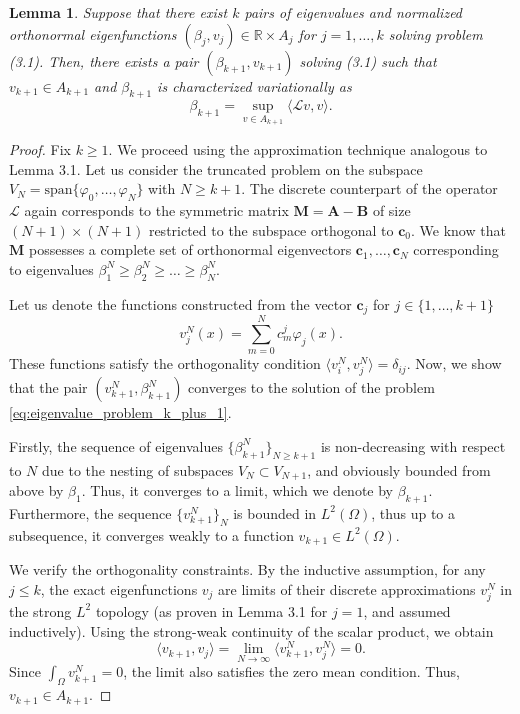 \documentclass[11pt, a4paper]{article}
\theoremstyle{break}
\theoremstyle{break}
\theoremstyle{break}
\theoremstyle{break}
\theoremstyle{break}
\newtheorem{lem}{Lemma}[section]
\theoremstyle{break}
\theoremstyle{break}
\theoremstyle{break}
\theoremstyle{break}
\theoremstyle{break}
\begin{document}
\begin{lem}
    \label{lem:inductive_step}
    Suppose that there exist $k$ pairs of eigenvalues and normalized orthonormal eigenfunctions $(\beta_j, v_j) \in \mathbb{R} \times A_j$ for $j=1, \ldots, k$ solving problem (3.1). Then, there exists a pair $(\beta_{k+1}, v_{k+1})$ solving (3.1) such that $v_{k+1} \in A_{k+1}$ and $\beta_{k+1}$ is characterized variationally as
    \begin{equation}
        \label{eq:eigenvalue_problem_k_plus_1}
        \beta_{k+1} = \sup_{v \in A_{k+1}} \langle \mathcal{L} v, v \rangle.
    \end{equation}
\end{lem}

\begin{proof}
    Fix $k \geq 1$. We proceed using the approximation technique analogous to Lemma 3.1. Let us consider the truncated problem on the subspace $V_N = \text{span}\{\varphi_0, \ldots, \varphi_N\}$ with $N \geq k+1$. The discrete counterpart of the operator $\mathcal{L}$ again corresponds to the symmetric matrix $\mathbf{M} = \mathbf{A} - \mathbf{B}$ of size $(N+1) \times (N+1)$ restricted to the subspace orthogonal to $\mathbf{c}_0$. We know that $\mathbf{M}$ possesses a complete set of orthonormal eigenvectors $\mathbf{c}_1, \ldots, \mathbf{c}_N$ corresponding to eigenvalues $\beta_1^N \geq \beta_2^N \geq \ldots \geq \beta_N^N$. 
    
    Let us denote the functions constructed from the vector $\mathbf{c}_j$ for $j \in \{1, \ldots, k+1\}$
    \begin{equation}
        v_j^N(x) = \sum_{m=0}^N c^j_m \varphi_j(x).
    \end{equation}
    These functions satisfy the orthogonality condition $\langle v_i^N, v_j^N \rangle = \delta_{ij}$. Now, we show that the pair $(v_{k+1}^N, \beta_{k+1}^N)$ converges to the solution of the problem \eqref{eq:eigenvalue_problem_k_plus_1}.
    
    Firstly, the sequence of eigenvalues $\{\beta_{k+1}^N\}_{N \geq k+1}$ is non-decreasing with respect to $N$ due to the nesting of subspaces $V_N \subset V_{N+1}$, and obviously bounded from above by $\beta_1$. Thus, it converges to a limit, which we denote by $\beta_{k+1}$. Furthermore, the sequence $\{v_{k+1}^N\}_{N}$ is bounded in $L^2(\Omega)$, thus up to a subsequence, it converges weakly to a function $v_{k+1} \in L^2(\Omega)$.
    
    We verify the orthogonality constraints. By the inductive assumption, for any $j \leq k$, the exact eigenfunctions $v_j$ are limits of their discrete approximations $v_j^N$ in the strong $L^2$ topology (as proven in Lemma 3.1 for $j=1$, and assumed inductively). Using the strong-weak continuity of the scalar product, we obtain
    \begin{equation}
        \langle v_{k+1}, v_j \rangle = \lim_{N \to \infty} \langle v_{k+1}^N, v_j^N \rangle = 0.
    \end{equation}
    Since $\int_\Omega v_{k+1}^N = 0$, the limit also satisfies the zero mean condition. Thus, $v_{k+1} \in A_{k+1}$.
    

\end{proof}
\end{document}
